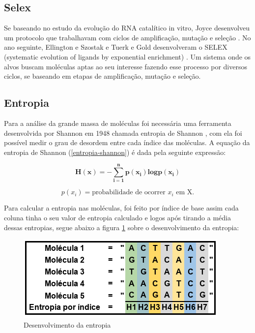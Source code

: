 \subsection{Selex}
Se baseando no estudo da evolução do RNA catalítico in vitro, Joyce desenvolveu um
protocolo que trabalhavam com ciclos de amplificação, mutação e seleção \citep{11}. No ano seguinte, Ellington e Szostak \citep{12} e Tuerk e Gold \citep{13} desenvolveram o SELEX
(systematic evolution of ligands by exponential enrichment) \citep{12,13}. Um sistema onde os alvos buscam moléculas aptas ao seu interesse fazendo esse processo por diversos ciclos, se baseando em etapas de amplificação, mutação e seleção.

\subsection{Entropia}

Para a análise da grande massa de moléculas foi necessária uma ferramenta
desenvolvida por Shannon em 1948 \citep{3} chamada entropia de Shannon \citep{4}, com ela foi
possível medir o grau de desordem entre cada índice das moléculas. A equação da entropia de
Shannon (\ref{entropia-shannon}) é dada pela seguinte expressão:

\begin{equation}
    \label{entropia-shannon}
    \mathbf{H(x) = -\sum\limits_{i=1}^{n}p(x_i)log p(x_i)}
\end{equation}

$$p(x_i)=\text{probabilidade de ocorrer } x_i\text{ em X.}$$

Para calcular a entropia nas moléculas, foi feito por índice de base assim cada
coluna tinha o seu valor de entropia calculado e logos após tirando a média dessas
entropias, segue abaixo a figura \ref{fig:example-entropia} sobre o desenvolvimento da entropia:

\begin{figure}[!h]
    \centering
    \includegraphics[scale=0.7]{figures/img-entropia.png}
    \caption{Desenvolvimento da entropia}
    \label{fig:example-entropia}
\end{figure}
